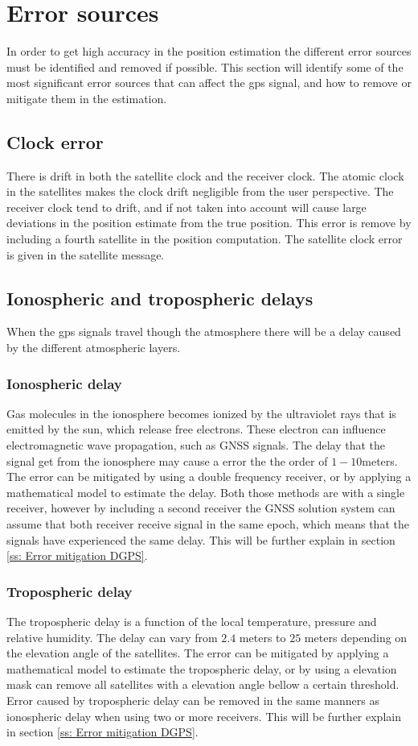 \section{Error sources}
In order to get high accuracy in the position estimation the different error sources must be identified and removed if possible. This section will identify some of the most significant error sources that can affect the \gls{gps} signal, and how to remove or mitigate them in the estimation.
\subsection{Clock error}
There is drift in both the satellite clock and the receiver clock. The atomic clock in the satellites makes the clock drift negligible from the user perspective. The receiver clock tend to drift, and if not taken into account will cause large deviations in the position estimate from the true position. This error is remove by including a fourth satellite in the position computation. The satellite clock error is given in the satellite message. 

\subsection{Ionospheric and tropospheric delays}
When the \gls{gps} signals travel though the atmosphere there will be a delay caused by the different atmospheric layers.
\subsubsection{Ionospheric delay}
Gas molecules in the ionosphere becomes ionized by the ultraviolet rays that is emitted by the sun, which release free electrons. These electron can influence electromagnetic wave propagation, such as GNSS signals. The delay that the signal get from the ionosphere may cause a error the the order of $1-10 $meters. The error can be mitigated by using a double frequency receiver, or by applying a mathematical model to estimate the delay. Both those methods are with a single receiver, however by including a second receiver the GNSS solution system can assume that both receiver receive signal in the same epoch, which means that the signals have experienced the same delay. This will be further explain in section \ref{ss: Error mitigation DGPS}.

\subsubsection{Tropospheric delay}
The tropospheric delay is a function of the local temperature, pressure and relative humidity. The delay can vary from $2.4$ meters to $25$ meters depending on the elevation angle of the satellites. The error can be mitigated by applying a mathematical model to estimate the tropospheric delay, or by using a elevation mask can remove all satellites with a elevation angle bellow a certain threshold. Error caused by tropospheric delay can be removed in the same manners as ionospheric delay when using two or more receivers. This will be further explain in section \ref{ss: Error mitigation DGPS}.

